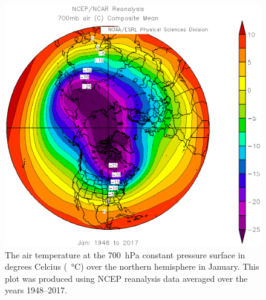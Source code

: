 \documentclass[11pt]{article}
\begin{document}
\begin{figure}
  \centering
  \includegraphics[width=\textwidth]{AirT700hPa.png}
  \caption{The air temperature at the \SI{700}{\hecto\Pa} constant pressure surface in degrees Celcius (\SI{}{\degreeCelsius}) over the northern hemisphere in January. This plot was produced using NCEP reanalysis data averaged over the years 1948--2017.}
  \label{fig:AirT700hPa}
\end{figure}
\end{document}

